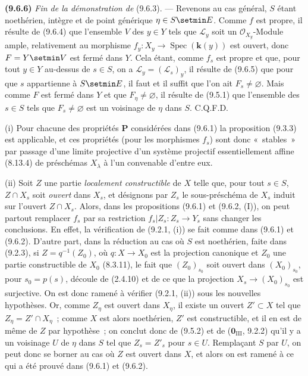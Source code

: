 \label{IV.9.6.6-fr}%
\textbf{(9.6.6)} \emph{Fin de la démonstration de} (9.6.3). --- Revenons au cas
général, $S$ étant noethérien, intègre et de point générique
$\eta\in S\setmin E$. Comme $f$ est propre, il résulte de (9.6.4) que l'ensemble $V$
des $y\in Y$ tels que $\mathcal L_y$ soit un $\mathcal O_{X_y}$-Module ample,
relativement au morphisme $f_y:X_y\to\operatorname{Spec}(\boldsymbol{k}(y))$ est ouvert,
donc $F=Y\setmin V$ est fermé dans $Y$. Cela étant, comme $f_s$ est propre et que,
pour tout $y\in Y$ au-dessus de $s\in S$, on a
$\mathcal L_y=(\mathcal L_s)_y$, il résulte de (9.6.5) que pour que $s$
appartienne à $S\setmin E$, il faut et il suffit que l'on ait $F_s\neq\varnothing$.
Mais comme $F$ est fermé dans $Y$ et que $F_\eta\neq\varnothing$, il résulte
de (9.5.1) que l'ensemble des $s\in S$ tels que $F_s\neq\varnothing$ est un
voisinage de $\eta$ dans $S$. C.Q.F.D.

\begin{remarks}[9.6.7]
\label{IV.9.6.7-fr}
(i) Pour chacune des propriétés $\boldsymbol{P}$ considérées dans (9.6.1) la proposition
(9.3.3) est applicable, et ces propriétés (pour les morphismes $f_s$) sont donc
«~stables~» par passage d'une limite projective d'un système projectif
essentiellement affine (8.13.4) de préschémas $X_\lambda$ à l'un convenable
d'entre eux.

(ii) Soit $Z$ une partie \emph{localement constructible} de $X$ telle que, pour
tout $s\in S$, $Z\cap X_s$ soit \emph{ouvert} dans $X_s$, et désignons par
$Z_s$ le sous-préschéma de $X_s$ induit sur l'ouvert $Z\cap X_s$.
Alors, dans les propositions (9.6.1) et (9.6.2, (I)), on peut partout remplacer
$f_s$ par sa restriction $f_s|Z_s:Z_s\to Y_s$ sans changer les conclusions. En
effet, la vérification de (9.2.1, (i)) se fait comme dans (9.6.1) et (9.6.2).
D'autre part, dans la réduction au cas où $S$ est noethérien, faite dans
(9.2.3), si $Z=q^{-1}(Z_0)$, où $q:X\to X_0$ est la projection canonique et
$Z_0$ une partie constructible de $X_0$ (8.3.11), le fait que
$(Z_0)_{s_0}$ soit ouvert dans $(X_0)_{s_0}$, pour $s_0=p(s)$, découle de
(2.4.10) et de ce que la projection $X_s\to(X_0)_{s_0}$ est surjective. On est
donc ramené à vérifier (9.2.1, (ii)) sous les nouvelles hypothèses. Or, comme
$Z_\eta$ est ouvert dans $X_\eta$, il existe un ouvert $Z'\subset X$ tel que
$Z_\eta=Z'\cap X_\eta$~; comme $X$ est alors noethérien, $Z'$ est
constructible, et il en est de même de $Z$ par hypothèse~; on conclut donc de
(9.5.2) et de ($\mathbf 0_{\mathrm{III}}$, 9.2.2) qu'il y a un voisinage $U$
de $\eta$ dans $S$ tel que $Z_s=Z'_s$ pour $s\in U$. Remplaçant $S$ par $U$,
on peut donc se borner au cas où $Z$ est ouvert dans $X$, et alors on est
ramené à ce qui a été prouvé dans (9.6.1) et (9.6.2).
\end{remarks}

